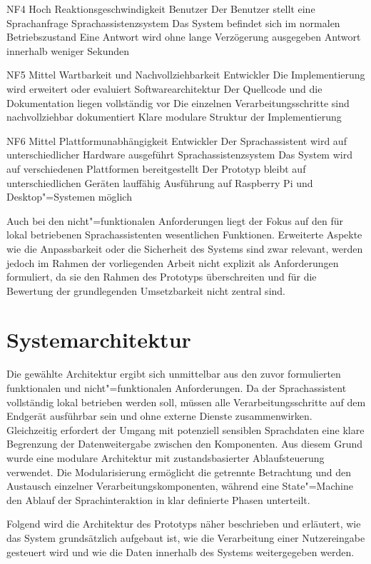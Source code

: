 \qas
{NF4}
{Hoch}
{Reaktionsgeschwindigkeit}
{Benutzer}
{Der Benutzer stellt eine Sprachanfrage}
{Sprachassistenzsystem}
{Das System befindet sich im normalen Betriebszustand}
{Eine Antwort wird ohne lange Verzögerung ausgegeben}
{Antwort innerhalb weniger Sekunden}
\clearpage

\qas
{NF5}
{Mittel}
{Wartbarkeit und Nachvollziehbarkeit}
{Entwickler}
{Die Implementierung wird erweitert oder evaluiert}
{Softwarearchitektur}
{Der Quellcode und die Dokumentation liegen vollständig vor}
{Die einzelnen Verarbeitungsschritte sind nachvollziehbar dokumentiert}
{Klare modulare Struktur der Implementierung}

\qas
{NF6}
{Mittel}
{Plattformunabhängigkeit}
{Entwickler}
{Der Sprachassistent wird auf unterschiedlicher Hardware ausgeführt}
{Sprachassistenzsystem}
{Das System wird auf verschiedenen Plattformen bereitgestellt}
{Der Prototyp bleibt auf unterschiedlichen Geräten lauffähig}
{Ausführung auf Raspberry Pi und Desktop"=Systemen möglich}

Auch bei den nicht"=funktionalen Anforderungen liegt der Fokus auf den für lokal betriebenen Sprachassistenten wesentlichen Funktionen. Erweiterte Aspekte wie die Anpassbarkeit oder die Sicherheit des Systems sind zwar relevant, werden jedoch im Rahmen der vorliegenden Arbeit nicht explizit als Anforderungen formuliert, da sie den Rahmen des Prototyps überschreiten und für die Bewertung der grundlegenden Umsetzbarkeit nicht zentral sind.
\clearpage


\section{Systemarchitektur}
\label{sec:Systemarchitektur}
Die gewählte Architektur ergibt sich unmittelbar aus den zuvor formulierten funktionalen und nicht"=funktionalen Anforderungen. Da der Sprachassistent vollständig lokal betrieben werden soll, müssen alle Verarbeitungsschritte auf dem Endgerät ausführbar sein und ohne externe Dienste zusammenwirken. Gleichzeitig erfordert der Umgang mit potenziell sensiblen Sprachdaten eine klare Begrenzung der Datenweitergabe zwischen den Komponenten. Aus diesem Grund wurde eine modulare Architektur mit zustandsbasierter Ablaufsteuerung verwendet. Die Modularisierung ermöglicht die getrennte Betrachtung und den Austausch einzelner Verarbeitungskomponenten, während eine State"=Machine den Ablauf der Sprachinteraktion in klar definierte Phasen unterteilt.

Folgend wird die Architektur des Prototyps näher beschrieben und erläutert, wie das System grundsätzlich aufgebaut ist, wie die Verarbeitung einer Nutzereingabe gesteuert wird und wie die Daten innerhalb des Systems weitergegeben werden.


